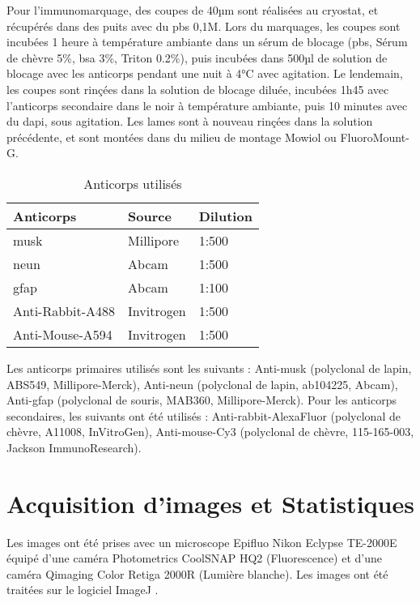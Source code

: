 	Pour l'immunomarquage, des coupes de 40µm sont réalisées au cryostat, et récupérés dans des puits avec du \acrshort{pbs} 0,1M. Lors du marquages, les coupes sont incubées 1 heure à température ambiante dans un sérum de blocage (\acrshort{pbs}, Sérum de chèvre 5\%, \acrshort{bsa} 3\%, Triton 0.2\%), puis  incubées dans 500µl de solution de blocage avec les anticorps pendant une nuit à 4°C avec agitation. Le lendemain, les coupes sont rinçées dans la solution de blocage diluée, incubées 1h45 avec l'anticorps secondaire dans le noir à température ambiante, puis 10 minutes avec du \gls{dapi}, sous agitation. Les lames sont à nouveau rinçées dans la solution précédente, et sont montées dans du milieu de montage Mowiol ou FluoroMount-G.
	
\begin{table}
		\begin{tabular}{l l l}
		\hline
		Anticorps 					    & Source 					& Dilution \\
		\hline
		\acrshort{musk} 	    & Millipore 				& 1:500 \\
		\acrshort{neun} 	     & Abcam 					& 1:500 \\
		\acrshort{gfap} 	      & Abcam 					 & 1:100 \\
		Anti-Rabbit-A488      & Invitrogen 				& 1:500\\
		Anti-Mouse-A594 	& Invitrogen 			  & 1:500\\
		\hline
	\end{tabular}
\caption{Anticorps utilisés}
\label{TableAc}
\end{table}
	
	Les anticorps primaires utilisés sont les suivants : Anti-\acrshort{musk} (polyclonal de lapin, ABS549, Millipore-Merck),  Anti-\acrshort{neun} (polyclonal de lapin, ab104225, Abcam), Anti-\acrshort{gfap} (polyclonal de souris, MAB360, Millipore-Merck). Pour les anticorps secondaires, les suivants ont été utilisés : Anti-rabbit-AlexaFluor (polyclonal de chèvre, A11008, InVitroGen), Anti-mouse-Cy3 (polyclonal de chèvre, 115-165-003, Jackson ImmunoResearch).
	
\section{Acquisition d'images et Statistiques}
\label{sec:ImagesStats}
	Les images ont été prises avec un microscope Epifluo Nikon Eclypse TE-2000E équipé d'une caméra Photometrics CoolSNAP HQ2 (Fluorescence) et d'une caméra Qimaging Color Retiga 2000R (Lumière blanche).
	Les images ont été traitées sur le logiciel ImageJ \cite{Schneider2012}.